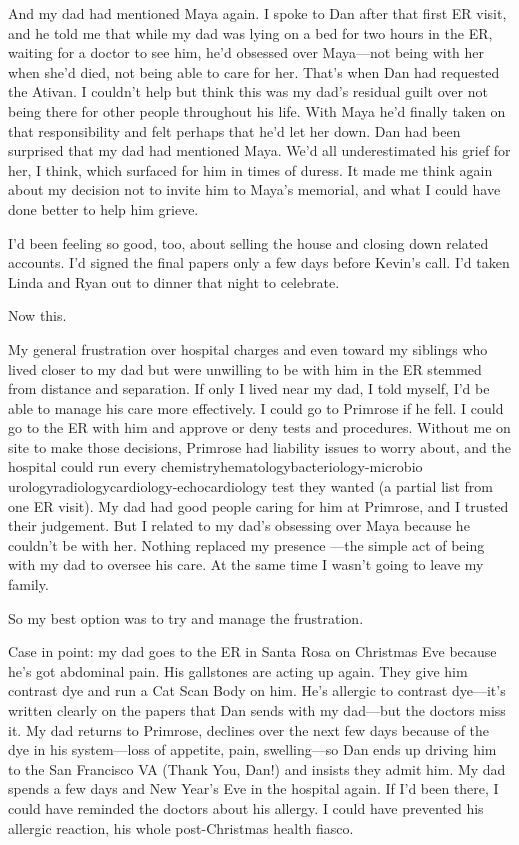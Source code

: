 \documentclass[12pt]{book}
\begin{document}
And my dad had mentioned Maya again. I spoke to Dan after that first ER visit, and he told me that while my dad was lying on a bed for two hours in the ER, waiting for a doctor to see him, he'd obsessed over Maya---not being with her when she'd died, not being able to care for her. That's when Dan had requested the Ativan. I couldn't help but think this was my dad's residual guilt over not being there for other people throughout his life. With Maya he'd finally taken on that responsibility and felt perhaps that he'd let her down. Dan had been surprised that my dad had mentioned Maya. We'd all underestimated his grief for her, I think, which surfaced for him in times of duress. It made me think again about my decision not to invite him to Maya's memorial, and what I could have done better to help him grieve.

I'd been feeling so good, too, about selling the house and closing down related accounts. I'd signed the final papers only a few days before Kevin's call. I'd taken Linda and Ryan out to dinner that night to celebrate.

Now this.

My general frustration over hospital charges and even toward my siblings who lived closer to my dad but were unwilling to be with him in the ER stemmed from distance and separation. If only I lived near my dad, I told myself, I'd be able to manage his care more effectively. I could go to Primrose if he fell. I could go to the ER with him and approve or deny tests and procedures. Without me on site to make those decisions, Primrose had liability issues to worry about, and the hospital could run every chemistry\/hematology\/bacteriology-microbio\/ urology\/radiology\/cardiology-echocardiology test they wanted (a partial list from one ER visit). My dad had good people caring for him at Primrose, and I trusted their judgement. But I related to my dad's obsessing over Maya because he couldn't be with her. Nothing replaced my presence ---the simple act of being with my dad to oversee his care. At the same time I wasn't going to leave my family.

So my best option was to try and manage the frustration.

Case in point: my dad goes to the ER in Santa Rosa on Christmas Eve because he's got abdominal pain. His gallstones are acting up again. They give him contrast dye and run a Cat Scan Body on him. He's allergic to contrast dye---it's written clearly on the papers that Dan sends with my dad---but the doctors miss it. My dad returns to Primrose, declines over the next few days because of the dye in his system---loss of appetite, pain, swelling---so Dan ends up driving him to the San Francisco VA (Thank You, Dan!) and insists they admit him. My dad spends a few days and New Year's Eve in the hospital again. If I'd been there, I could have reminded the doctors about his allergy. I could have prevented his allergic reaction, his whole post-Christmas health fiasco.
\end{document}
